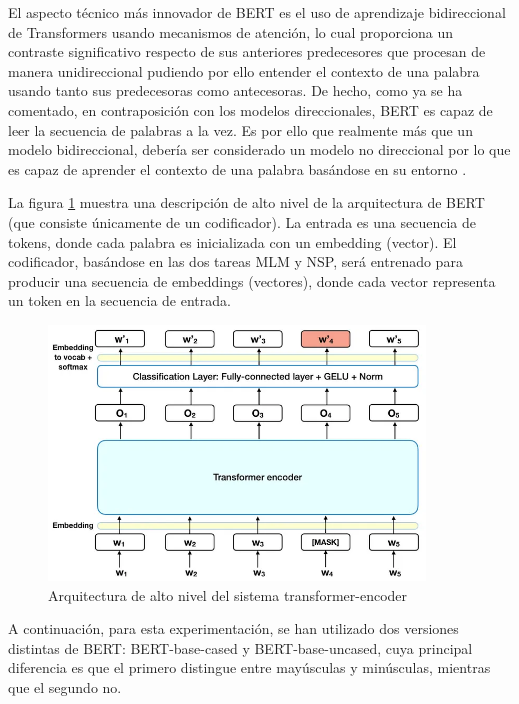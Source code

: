 El aspecto técnico más innovador de BERT es el uso de aprendizaje bidireccional de Transformers usando mecanismos de atención, lo cual proporciona un contraste significativo respecto de sus anteriores predecesores que procesan de manera unidireccional pudiendo por ello entender el contexto de una palabra usando tanto sus predecesoras como antecesoras. De hecho, como ya se ha comentado, en contraposición con los modelos direccionales, BERT es capaz de leer la secuencia de palabras a la vez. Es por ello que realmente más que un modelo bidireccional, debería ser considerado un modelo no direccional por lo que es capaz de aprender el contexto de una palabra basándose en su entorno \cite{Bert-exp}.

La figura \ref{fig:bert-exp} muestra una descripción de alto nivel de la arquitectura de BERT (que consiste únicamente de un codificador). La entrada es una secuencia de tokens, donde cada palabra es inicializada con un embedding (vector). El codificador, basándose en las dos tareas MLM y NSP, será entrenado para producir una secuencia de embeddings (vectores), donde cada vector representa un token en la secuencia de entrada. 

\begin{figure}[H]
    \centering
    \includegraphics[width=10cm]{imagenes/Modelos/transformer-encoder.png}
    \caption{\centering Arquitectura de alto nivel del sistema transformer-encoder \cite{Bert-exp}}
    \label{fig:bert-exp}
\end{figure}


A continuación, para esta experimentación, se han utilizado dos versiones distintas de BERT: BERT-base-cased y BERT-base-uncased, cuya principal diferencia es que el primero distingue entre mayúsculas y minúsculas, mientras que el segundo no. 



